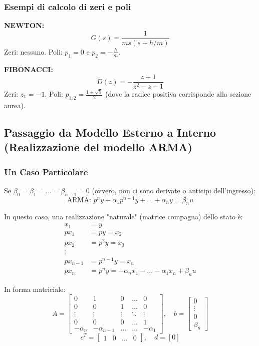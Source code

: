 \documentclass[11pt,a4paper]{article}
\begin{document}
\subsubsection{Esempi di calcolo di zeri e poli}
\textbf{NEWTON:} 
$$ G(s) = \frac{1}{ms(s+h/m)} $$
Zeri: nessuno. Poli: $p_1 = 0$ e $p_2 = -\frac{h}{m}$.

\textbf{FIBONACCI:}
$$ D(z) = -\frac{z+1}{z^2-z-1} $$
Zeri: $z_1 = -1$. Poli: $p_{1,2} = \frac{1 \pm \sqrt{5}}{2}$ (dove la radice positiva corrisponde alla sezione aurea).

\subsection{Passaggio da Modello Esterno a Interno (Realizzazione del modello ARMA)}

\subsubsection{Un Caso Particolare}
Se $\beta_0 = \beta_1 = \dots = \beta_{n-1} = 0$ (ovvero, non ci sono derivate o anticipi dell'ingresso):
$$ \text{ARMA: } p^n y + \alpha_1 p^{n-1} y + \dots + \alpha_n y = \beta_n u $$

In questo caso, una realizzazione "naturale" (matrice compagna) dello stato è:
\begin{align*}
x_1 &= y \\
px_1 &= py = x_2 \\
px_2 &= p^2y = x_3 \\
\vdots \\
px_{n-1} &= p^{n-1}y = x_n \\
px_n &= p^ny = -\alpha_n x_1 - \dots - \alpha_1 x_n + \beta_n u
\end{align*}

In forma matriciale:
$$ A = \begin{bmatrix} 
0 & 1 & 0 & \dots & 0 \\ 
0 & 0 & 1 & \dots & 0 \\ 
\vdots & \vdots & \vdots & \ddots & \vdots \\ 
0 & 0 & 0 & \dots & 1 \\ 
-\alpha_n & -\alpha_{n-1} & \dots & \dots & -\alpha_1 \end{bmatrix}, \quad 
b = \begin{bmatrix} 0 \\ \vdots \\ 0 \\ \beta_n \end{bmatrix} $$
$$ c^T = \begin{bmatrix} 1 & 0 & \dots & 0 \end{bmatrix}, \quad d = [0] $$
\end{document}
